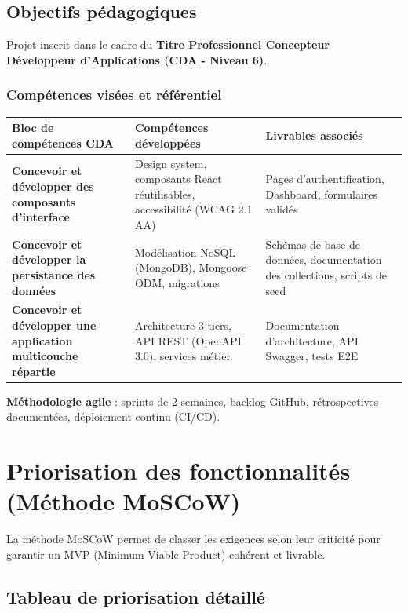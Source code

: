 \subsection{Objectifs pédagogiques}

Projet inscrit dans le cadre du \textbf{Titre Professionnel Concepteur Développeur d'Applications (CDA - Niveau 6)}.

\subsubsection{Compétences visées et référentiel}

\begin{center}
\begin{tabular}{|p{4.5cm}|p{5cm}|p{5cm}|}
\hline
\textbf{Bloc de compétences CDA} & \textbf{Compétences développées} & \textbf{Livrables associés} \\
\hline
\textbf{Concevoir et développer des composants d'interface} & Design system, composants React réutilisables, accessibilité (WCAG 2.1 AA) & Pages d'authentification, Dashboard, formulaires validés \\
\hline
\textbf{Concevoir et développer la persistance des données} & Modélisation NoSQL (MongoDB), Mongoose ODM, migrations & Schémas de base de données, documentation des collections, scripts de seed \\
\hline
\textbf{Concevoir et développer une application multicouche répartie} & Architecture 3-tiers, API REST (OpenAPI 3.0), services métier & Documentation d'architecture, API Swagger, tests E2E \\
\hline
\end{tabular}
\end{center}

\textbf{Méthodologie agile} : sprints de 2 semaines, backlog GitHub, rétrospectives documentées, déploiement continu (CI/CD).

\section{Priorisation des fonctionnalités (Méthode MoSCoW)}

La méthode MoSCoW permet de classer les exigences selon leur criticité pour garantir un MVP (Minimum Viable Product) cohérent et livrable.

\subsection{Tableau de priorisation détaillé}

